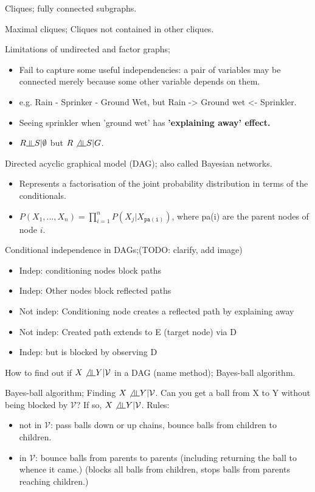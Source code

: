 \documentclass{article}
\newcommand{\indep}{\rotatebox[origin=c]{90}{$\models$}}
\begin{document}
Cliques; fully connected subgraphs.

Maximal cliques; Cliques not contained in other cliques.

Limitations of undirected and factor graphs; \begin{itemize}
	\item Fail to capture some useful independencies: a pair of variables may be connected merely because some other variable depends on them.
	\item e.g. Rain - Sprinker - Ground Wet, but Rain -> Ground wet <- Sprinkler.
	\item Seeing sprinkler when 'ground wet' has \bf{'explaining away'} effect.
	\item $R \indep S|\emptyset$ but $R \not\indep S | G$.
\end{itemize}

Directed acyclic graphical model (DAG); also called Bayesian networks. \begin{itemize}
	\item Represents a factorisation of the joint probability distribution in terms of the conditionals.
	\item $P(X_1,...,X_n)=\prod_{i=1}^n P(X_j|X_\mathtt{pa(i)})$, where pa(i) are the parent nodes of node $i$.
\end{itemize}

Conditional independence in DAGs;(TODO: clarify, add image) \begin{itemize}
	\item Indep: conditioning nodes block paths
	\item Indep: Other nodes block reflected paths
	\item Not indep: Conditioning node creates a reflected path by explaining away
	\item Not indep: Created path extends to E (target node) via D
	\item Indep: but is blocked by observing D
\end{itemize}

How to find out if $X \not \indep Y | \mathcal{V}$ in a DAG (name method); Bayes-ball algorithm.

Bayes-ball algorithm; Finding $X \not \indep Y | \mathcal{V}$. \newline Can you get a ball from X to Y without being blocked by $\mathcal{V}$? If so, $X \not \indep Y | \mathcal{V}$. Rules:
\begin{itemize}
	\item not in $\mathcal{V}$: pass balls down or up chains, bounce balls from children to children.
	\item in $\mathcal{V}$: bounce balls from parents to parents (including returning the ball to whence it came.) (blocks all balls from children, stops balls from parents reaching children.)
\end{itemize}
\end{document}
